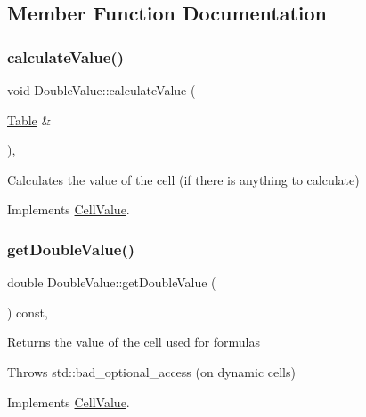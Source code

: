 \subsection{Member Function Documentation}
\mbox{\label{classDoubleValue_a81b080a38fbc9de10db424f0eb381fd9}} 
\subsubsection{\texorpdfstring{calculate\+Value()}{calculateValue()}}
{\footnotesize\ttfamily void Double\+Value\+::calculate\+Value (\begin{DoxyParamCaption}\item[{\hyperlink{classTable}{Table} \&}]{ }\end{DoxyParamCaption})\hspace{0.3cm}{\ttfamily [override]}, {\ttfamily [virtual]}}

Calculates the value of the cell (if there is anything to calculate) 

Implements \hyperlink{classCellValue_ab644256decf3608ed50e389ead6cf611}{Cell\+Value}.

\mbox{\label{classDoubleValue_ac598795c18713db7e49d07acd5859076}} 
\subsubsection{\texorpdfstring{get\+Double\+Value()}{getDoubleValue()}}
{\footnotesize\ttfamily double Double\+Value\+::get\+Double\+Value (\begin{DoxyParamCaption}{ }\end{DoxyParamCaption}) const\hspace{0.3cm}{\ttfamily [override]}, {\ttfamily [virtual]}}

Returns the value of the cell used for formulas

Throws std\+::bad\+\_\+optional\+\_\+access (on dynamic cells) 

Implements \hyperlink{classCellValue_a3d2850b3a8473050fd46f486a29ed5bf}{Cell\+Value}.

\mbox{\label{classDoubleValue_a4b809052b3a6239196e344fac3119c09}} 
